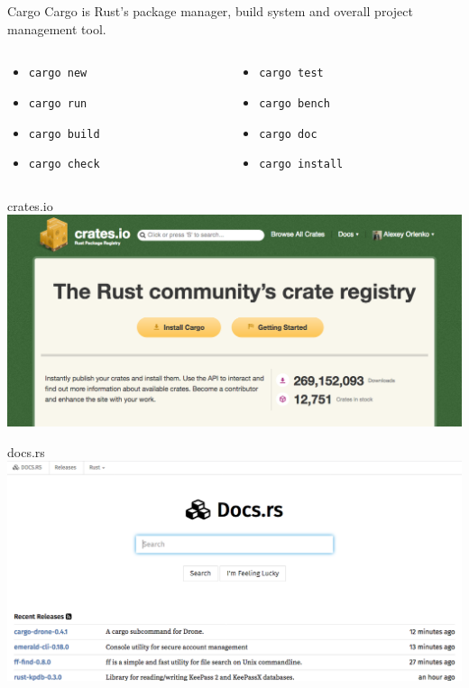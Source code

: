 \documentclass[12pt, aspectratio=169]{beamer}
\begin{document}
\begin{frame}{Cargo}
  Cargo is Rust's package manager, build system and overall project management
  tool.

  \begin{columns}
    \begin{column}{0.3\textwidth}
      \begin{itemize}
        \item \texttt{cargo new}
        \item \texttt{cargo run}
        \item \texttt{cargo build}
        \item \texttt{cargo check}
      \end{itemize}
    \end{column}

    \begin{column}{0.5\textwidth}
      \begin{itemize}
        \item \texttt{cargo test}
        \item \texttt{cargo bench}
        \item \texttt{cargo doc}
        \item \texttt{cargo install}
      \end{itemize}
    \end{column}
  \end{columns}
\end{frame}

\begin{frame}{crates.io}
  \includegraphics[width=\textwidth]{images/crates-io.png}
\end{frame}

\begin{frame}{docs.rs}
  \includegraphics[width=\textwidth]{images/docs-rs.png}
\end{frame}
\end{document}
